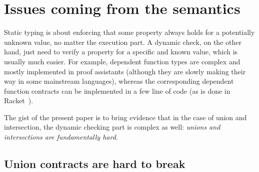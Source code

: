 \documentclass[sigplan,10pt,review,anonymous]{acmart}
\newcommand{\info}[2][1=]{}
\begin{document}
\newpage

\section{Issues coming from the semantics}
\label{sec:issues-sem}
\info{What goes wrong or difficult when trying to implement union and
  intersection literally}

Static typing is about enforcing that some property always holds for a
potentially unknown value, no matter the execution part. A dynamic check, on the
other hand, just need to verify a property for a specific and known value, which
is usually much easier. For example, dependent function types are complex and
mostly implemented in proof assistants (although they are slowly making their
way in some mainstream languages), whereas the corresponding dependent function
contracts can be implemented in a few line of code (as is done in
Racket~\cite{}).

The gist of the present paper is to bring evidence that in the case of union and
intersection, the dynamic checking part is complex as well: \emph{unions and
intersections are fundamentally hard}.

%
%

\subsection*{Union contracts are hard to break}
\end{document}
